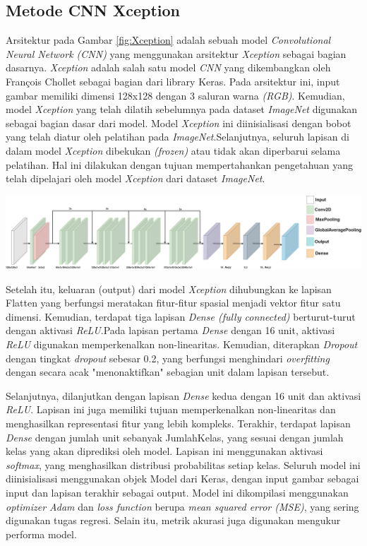 \subsection{Metode CNN Xception}

Arsitektur pada Gambar \ref{fig:Xception} adalah sebuah model \textit{Convolutional Neural Network (\textit{CNN})} yang menggunakan arsitektur \textit{Xception} sebagai bagian dasarnya. \textit{Xception} adalah salah satu model \textit{CNN} yang dikembangkan oleh François Chollet sebagai bagian dari library Keras. Pada arsitektur ini, input gambar memiliki dimensi 128x128 dengan 3 saluran warna \textit{(RGB)}. Kemudian, model \textit{Xception} yang telah dilatih sebelumnya pada dataset \textit{ImageNet} digunakan sebagai bagian dasar dari model. Model \textit{Xception} ini diinisialisasi dengan bobot yang telah diatur oleh pelatihan pada \textit{ImageNet}.Selanjutnya, seluruh lapisan di dalam model \textit{Xception} dibekukan \textit{(frozen)} atau tidak akan diperbarui selama pelatihan. Hal ini dilakukan dengan tujuan mempertahankan pengetahuan yang telah dipelajari oleh model \textit{Xception} dari dataset \textit{ImageNet}.

\begin{center}
	\includegraphics[width=1.0\linewidth]{gambar/bener//Arsitektur_CNNXception_Modifikasi.png}
	\label{fig:Xception}
\end{center}
Setelah itu, keluaran (output) dari model \textit{Xception} dihubungkan ke lapisan Flatten yang berfungsi meratakan fitur-fitur spasial menjadi vektor fitur satu dimensi. Kemudian, terdapat tiga lapisan \textit{Dense (fully connected)} berturut-turut dengan aktivasi \textit{ReLU}.Pada lapisan pertama \textit{Dense} dengan 16 unit, aktivasi \textit{ReLU} digunakan memperkenalkan non-linearitas. Kemudian, diterapkan \textit{Dropout} dengan tingkat \textit{dropout} sebesar 0.2, yang berfungsi menghindari \textit{overfitting} dengan secara acak "menonaktifkan" sebagian unit dalam lapisan tersebut.

Selanjutnya, dilanjutkan dengan lapisan \textit{Dense} kedua dengan 16 unit dan aktivasi \textit{ReLU}. Lapisan ini juga memiliki tujuan memperkenalkan non-linearitas dan menghasilkan representasi fitur yang lebih kompleks. Terakhir, terdapat lapisan \textit{Dense} dengan jumlah unit sebanyak JumlahKelas, yang sesuai dengan jumlah kelas yang akan diprediksi oleh model. Lapisan ini menggunakan aktivasi \textit{softmax}, yang menghasilkan distribusi probabilitas setiap kelas. Seluruh model ini diinisialisasi menggunakan objek Model dari Keras, dengan input gambar sebagai input dan lapisan terakhir sebagai output. Model ini dikompilasi menggunakan \textit{optimizer Adam} dan \textit{loss function} berupa\textit{ mean squared error (MSE)}, yang sering digunakan tugas regresi. Selain itu, metrik akurasi juga digunakan mengukur performa model.


